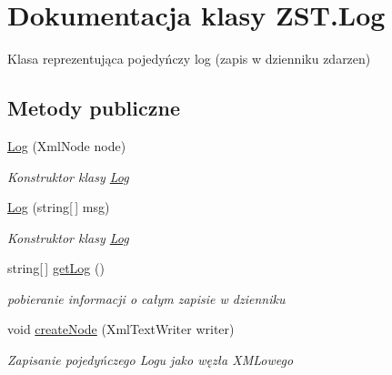 \hypertarget{class_z_s_t_1_1_log}{}\section{Dokumentacja klasy Z\+S\+T.\+Log}
\label{class_z_s_t_1_1_log}


Klasa reprezentująca pojedyńczy log (zapis w dzienniku zdarzen)  


\subsection*{Metody publiczne}
\begin{DoxyCompactItemize}
\item 
\hyperlink{class_z_s_t_1_1_log_a07cddad83ae898c2c6013a2b5c20d6d8}{Log} (Xml\+Node node)
\begin{DoxyCompactList}\small\item\em Konstruktor klasy \hyperlink{class_z_s_t_1_1_log}{Log} \end{DoxyCompactList}\item 
\hyperlink{class_z_s_t_1_1_log_aea522d0f2791697d32fd1d30df121391}{Log} (string\mbox{[}$\,$\mbox{]} msg)
\begin{DoxyCompactList}\small\item\em Konstruktor klasy \hyperlink{class_z_s_t_1_1_log}{Log} \end{DoxyCompactList}\item 
string\mbox{[}$\,$\mbox{]} \hyperlink{class_z_s_t_1_1_log_a1c256684db52090c18ade4f4a8058157}{get\+Log} ()
\begin{DoxyCompactList}\small\item\em pobieranie informacji o całym zapisie w dzienniku \end{DoxyCompactList}\item 
void \hyperlink{class_z_s_t_1_1_log_a96caeb14ebf1c3b16ca33fe71e42e962}{create\+Node} (Xml\+Text\+Writer writer)
\begin{DoxyCompactList}\small\item\em Zapisanie pojedyńczego Logu jako węzła X\+M\+Lowego \end{DoxyCompactList}\end{DoxyCompactItemize}
